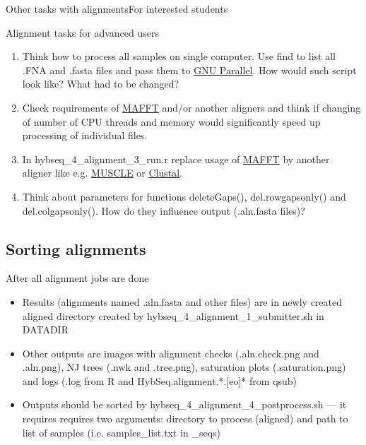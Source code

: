 \documentclass[compress,  xelatex, 11pt, xcolor=x11names, aspectratio=169,
	hyperref={
		bookmarks=true,
		unicode=true,
		colorlinks=true,
		pdftitle={HybSeq course},
		plainpages=false,
		pdfauthor={Vojtech Zeisek},
		pdfsubject={Practical processing of HybSeq target enrichment sequencing data on computing grids like MetaCentrum},
		pdfcreator={XeLaTeX},
		pdfkeywords={BASH, command line, GNU, HybSeq, Linux, MetaCentrum, sequencing shell, target enrichment},
		linkcolor=Turquoise4, %
		anchorcolor=DodgerBlue4, %
		citecolor=DodgerBlue4, %
		filecolor=DodgerBlue4, %
		menucolor=Tan4, %
		urlcolor=DarkOliveGreen4 %
		},
	url={hyphens, lowtilde} %
	]{beamer}
\renewcommand{\texttt}[1]{\colorbox{Cornsilk2}{{\ttfamily #1}}}
\begin{document}
\begin{frame}{Other tasks with alignments}{For interested students}
	\begin{exampleblock}{Alignment tasks for advanced users}
		\begin{enumerate}
			\item Think how to process all samples on single computer. Use \texttt{find} to list all \texttt{*.FNA} and \texttt{*.fasta} files and pass them to \href{https://www.gnu.org/software/parallel/}{GNU Parallel}. How would such script look like? What had to be changed?
			\item Check requirements of \href{https://mafft.cbrc.jp/alignment/software/}{MAFFT} and/or another aligners and think if changing of number of CPU threads and memory would significantly speed up processing of individual files.
			\item In \texttt{hybseq\_4\_alignment\_3\_run.r} replace usage of \href{https://mafft.cbrc.jp/alignment/software/}{MAFFT} by another aligner like e.g. \href{https://www.drive5.com/muscle/}{MUSCLE} or \href{http://clustal.org/}{Clustal}.
			\item Think about parameters for functions \texttt{deleteGaps()}, \texttt{del.rowgapsonly()} and \texttt{del.colgapsonly()}. How do they influence output (\texttt{*.aln.fasta} files)?
		\end{enumerate}
	\end{exampleblock}
\end{frame}

\subsection{Sorting alignments}

\begin{frame}{After all alignment jobs are done}
	\begin{itemize}
		\item Results (alignments named \texttt{*.aln.fasta} and other files) are in newly created \texttt{aligned} directory created by \texttt{hybseq\_4\_alignment\_1\_submitter.sh} in \texttt{DATADIR}
		\item Other outputs are images with alignment checks (\texttt{*.aln.check.png} and \texttt{*.aln.png}), NJ trees (\texttt{*.nwk} and \texttt{*.tree.png}), saturation plots (\texttt{*.saturation.png}) and logs (\texttt{*.log} from \texttt{R} and \texttt{HybSeq.alignment.*.[eo]*} from \texttt{qsub})
		\item Outputs should be sorted by \texttt{hybseq\_4\_alignment\_4\_postprocess.sh} --- it requires requires two arguments: directory to process (\texttt{aligned}) and path to list of samples (i.e. \texttt{samples\_list.txt} in \texttt{2\_seqs})
	\end{itemize}
\end{frame}
\end{document}
